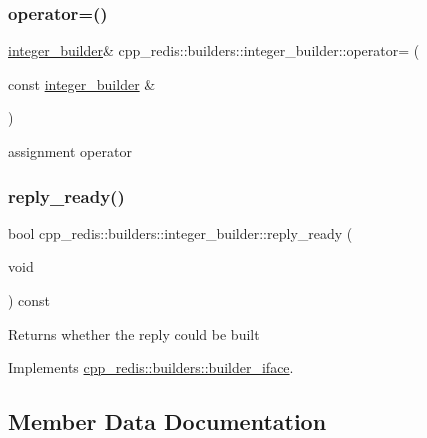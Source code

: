 \subsubsection{\texorpdfstring{operator=()}{operator=()}}
{\footnotesize\ttfamily \hyperlink{classcpp__redis_1_1builders_1_1integer__builder}{integer\+\_\+builder}\& cpp\+\_\+redis\+::builders\+::integer\+\_\+builder\+::operator= (\begin{DoxyParamCaption}\item[{const \hyperlink{classcpp__redis_1_1builders_1_1integer__builder}{integer\+\_\+builder} \&}]{ }\end{DoxyParamCaption})\hspace{0.3cm}{\ttfamily [delete]}}



assignment operator 

\mbox{\label{classcpp__redis_1_1builders_1_1integer__builder_a4893dc36d06d75094bb4fe3fbc826966}} 
\subsubsection{\texorpdfstring{reply\+\_\+ready()}{reply\_ready()}}
{\footnotesize\ttfamily bool cpp\+\_\+redis\+::builders\+::integer\+\_\+builder\+::reply\+\_\+ready (\begin{DoxyParamCaption}\item[{void}]{ }\end{DoxyParamCaption}) const\hspace{0.3cm}{\ttfamily [virtual]}}

\begin{DoxyReturn}{Returns}
whether the reply could be built 
\end{DoxyReturn}


Implements \hyperlink{classcpp__redis_1_1builders_1_1builder__iface_a40db9a31d4ea1771777e74146d31e12d}{cpp\+\_\+redis\+::builders\+::builder\+\_\+iface}.



\subsection{Member Data Documentation}
\mbox{\label{classcpp__redis_1_1builders_1_1integer__builder_af3b37f54856e09f45fdd8c9f0443d8a7}} 
